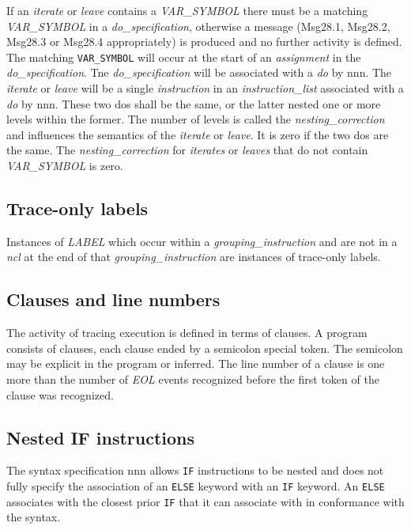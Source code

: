 If an \emph{iterate} or \emph{leave} contains a \emph{VAR\_SYMBOL} there
must be a matching \emph{VAR\_SYMBOL} in a \emph{do\_specification},
otherwise a message (Msg28.1, Msg28.2, Msg28.3 or Msg28.4 appropriately)
is produced and no further activity is defined. The matching
\texttt{VAR\_SYMBOL} will occur at the start of an \emph{assignment} in
the \emph{do\_specification}. Tne \emph{do\_specification} will be
associated with a \emph{do} by nnn. The \emph{iterate} or \emph{leave}
will be a single \emph{instruction} in an \emph{instruction\_list}
associated with a \emph{do} by nnn. These two dos shall be the same, or
the latter nested one or more levels within the former. The number of
levels is called the \emph{nesting\_correction} and influences the
semantics of the \emph{iterate} or \emph{leave}. It is zero if the two
dos are the same. The \emph{nesting\_correction} for \emph{iterates} or
\emph{leaves} that do not contain \emph{VAR\_SYMBOL} is zero.

\subsection{Trace-only labels}\label{trace-only-labels}

Instances of \emph{LABEL} which occur within a
\emph{grouping\_instruction} and are not in a \emph{ncl} at the end of
that \emph{grouping\_instruction} are instances of trace-only labels.

\subsection{Clauses and line numbers}\label{clauses-and-line-numbers}

The activity of tracing execution is defined in terms of clauses. A
program consists of clauses, each clause ended by a semicolon special
token. The semicolon may be explicit in the program or inferred. The
line number of a clause is one more than the number of \emph{EOL} events
recognized before the first token of the clause was recognized.

\subsection{Nested IF instructions}\label{nested-if-instructions}

The syntax specification nnn allows
\texttt{\textquotesingle{}IF\textquotesingle{}} instructions to be
nested and does not fully specify the association of an
\texttt{\textquotesingle{}ELSE\textquotesingle{}} keyword with an
\texttt{\textquotesingle{}IF\textquotesingle{}} keyword. An
\texttt{\textquotesingle{}ELSE\textquotesingle{}} associates with the
closest prior \texttt{\textquotesingle{}IF\textquotesingle{}} that it
can associate with in conformance with the syntax.

